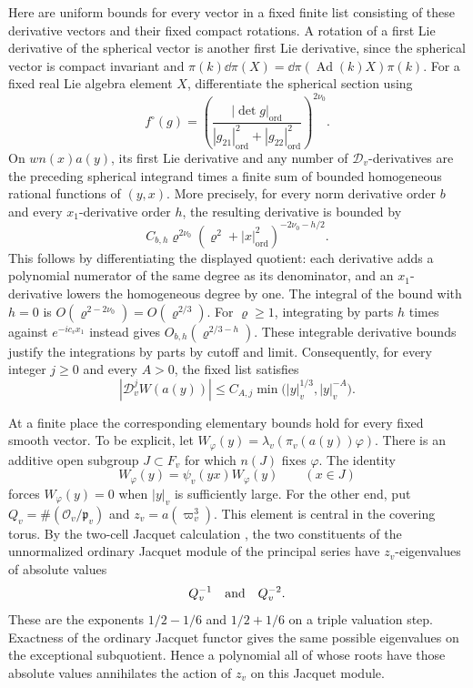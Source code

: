 Here are uniform bounds for every vector in a fixed finite list
consisting of these derivative vectors and their fixed compact
rotations.  A rotation of a first Lie derivative of the spherical
vector is another first Lie derivative, since the spherical vector
is compact invariant and
\(\pi(k)\dd\pi(X)=\dd\pi(\operatorname{Ad}(k)X)\pi(k)\).
For a fixed real Lie algebra element \(X\), differentiate the
spherical section using
\[
 f^\circ(g)=
 \left(\frac{|\det g|_{\mathrm{ord}}}
 {|g_{21}|_{\mathrm{ord}}^2+|g_{22}|_{\mathrm{ord}}^2}\right)^{2\nu_0}.
\]
On \(wn(x)a(y)\), its first Lie derivative and any number of
\(\mathcal D_v\)-derivatives are the preceding spherical integrand
times a finite sum of bounded homogeneous rational functions of
\((y,x)\).  More precisely, for every norm derivative order \(b\)
and every \(x_1\)-derivative order \(h\), the resulting derivative is
bounded by
\[
 C_{b,h} \varrho^{2\nu_0}
 (\varrho^2+|x|_{\mathrm{ord}}^2)^{-2\nu_0-h/2}.
\]
This follows by differentiating the displayed quotient: each
derivative adds a polynomial numerator of the same degree as its
denominator, and an \(x_1\)-derivative lowers the homogeneous degree
by one.  The integral of the bound with \(h=0\) is
\(O(\varrho^{2-2\nu_0})=O(\varrho^{2/3})\).  For \(\varrho\ge1\), integrating by parts
\(h\) times against \(e^{-ic_vx_1}\) instead gives
\(O_{b,h}(\varrho^{2/3-h})\).  These integrable derivative bounds justify the
integrations by parts by cutoff and limit.  Consequently, for every
integer \(j\ge0\) and every \(A>0\), the fixed list satisfies
\begin{equation}\label{eq:theta-complex-bounds}
 |\mathcal D_v^j W(a(y))|
 \le C_{A,j}\min\bigl(|y|_v^{1/3},|y|_v^{-A}\bigr).
\end{equation}

At a finite place the corresponding elementary bounds hold for every
fixed smooth vector.  To be explicit, let
\(W_\varphi(y)=\lambda_v(\pi_v(a(y))\varphi)\).  There is an additive
open subgroup \(J\subset F_v\) for which \(n(J)\) fixes \(\varphi\).
The identity
\[
 W_\varphi(y)=\psi_v(yx)W_\varphi(y)\qquad(x\in J)
\]
forces \(W_\varphi(y)=0\) when \(|y|_v\) is sufficiently large.
For the other end, put \(Q_v=\#(\mathcal O_v/\mathfrak p_v)\) and
\(z_v=a(\varpi_v^3)\).  This element is central in the covering
torus.  By the two-cell Jacquet calculation
\cite[Proposition~I.2.1, p.~61, and Theorem~I.2.9(e), p.~72]{KP84}, the two
constituents of the unnormalized ordinary Jacquet module of the
principal series have \(z_v\)-eigenvalues of absolute values
\[
 Q_v^{-1}\quad\hbox{and}\quad Q_v^{-2}.
\]
These are the exponents \(1/2-1/6\) and \(1/2+1/6\) on a triple
valuation step.  Exactness of the ordinary Jacquet functor gives the
same possible eigenvalues on the exceptional subquotient.  Hence a
polynomial all of whose roots have those absolute values annihilates
the action of \(z_v\) on this Jacquet module.

